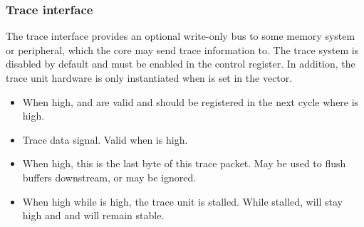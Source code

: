 
\subsubsection{Trace interface}
\label{sec:core-ug-cfg-inst-iface-trace}

The trace interface provides an optional write-only bus to some memory system or 
peripheral, which the core may send trace information to. The trace system is 
disabled by default and must be enabled in the  control register. In 
addition, the trace unit hardware is only instantiated when  
is set in the  vector.

\begin{itemize}

\item {}

When high,  and  are valid and should 
be registered in the next cycle where  is high.

\vspace{1em}
\item {}

Trace data signal. Valid when  is high.

\vspace{1em}
\item {}

When high, this is the last byte of this trace packet. May be used to flush 
buffers downstream, or may be ignored.

\vspace{1em}
\item {}

When high while  is high, the trace unit is stalled. While 
stalled,  will stay high and  and 
 will remain stable.

\end{itemize}

